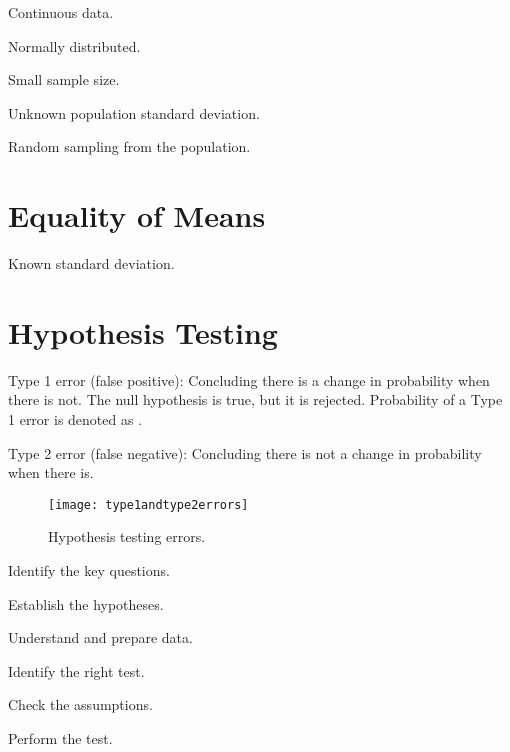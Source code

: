 \documentclass{article}
\begin{document}
	\begin{bulletedlist}
		\item Continuous data.
		\item Normally distributed.
		\item Small sample size.
		\item Unknown population standard deviation.
		\item Random sampling from the population.
	\end{bulletedlist}

	\section{Equality of Means}
Known standard deviation.

	\section{Hypothesis Testing}
Type 1 error (false positive): Concluding there is a change in probability when there is not.  The null hypothesis is true, but it is rejected.  Probability of a Type 1 error is denoted as \levelofsignificance{}.

Type 2 error (false negative): Concluding there is not a change in probability when there is.

	\begin{figure}[tbp]
		\centering
		\texttt{[image: type1andtype2errors]}
		\caption{Hypothesis testing errors.}
		\label{fig:type1andtype2errors}
	\end{figure}

	\begin{numberedlist}
		\item Identify the key questions.
		\item Establish the hypotheses.
		\item Understand and prepare data.
		\item Identify the right test.
		\item Check the assumptions.
		\item Perform the test.
	\end{numberedlist}
\end{document}
